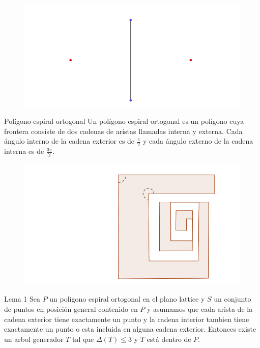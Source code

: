 \documentclass{beamer}
\begin{document}
\begin{frame}
\begin{figure}[h]
\includegraphics[width=\textwidth]{Arbol-imposible-sin-cruces}
\end{figure}
\end{frame}
\begin{frame}
\begin{block}{Polígono espiral ortogonal}
Un polígono espiral ortogonal es un polígono cuya frontera consiste de dos cadenas de aristas llamadas interna y externa. Cada ángulo interno de la cadena exterior es de $\frac{\pi }{2}$ y cada ángulo externo de la cadena interna es de $\frac{3\pi }{2}$.
\end{block}
\end{frame}
\begin{frame}
\begin{figure}[h]
\includegraphics[width=\textwidth]{Poligono-espiral}
\end{figure}
\end{frame}
\begin{frame}
\begin{block}{Lema 1}
Sea $P$ un polígono espiral ortogonal en el plano lattice y $S$ un conjunto de puntos en posición general contenido en $P$ y asumamos que cada arista de la cadena exterior tiene exactamente un punto y la cadena interior tambien tiene exactamente un punto o esta incluida en alguna cadena exterior. Entonces existe un arbol generador $T$  tal que $\Delta (T) \leq 3$ y $T$ está dentro de $P$.
\end{block}
\end{frame}
\end{document}
